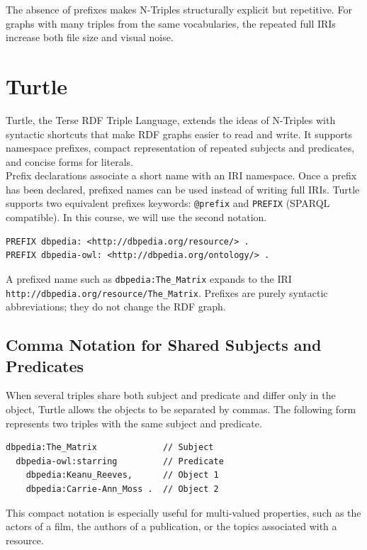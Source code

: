 \documentclass{scrbook}
\begin{document}
	The absence of prefixes makes N-Triples structurally explicit but repetitive. For graphs with many triples from the same vocabularies, the repeated full IRIs increase both file size and visual noise.
	
	\section{Turtle}
	
	Turtle, the Terse RDF Triple Language, extends the ideas of N-Triples with syntactic shortcuts that make RDF graphs easier to read and write. It supports namespace prefixes, compact representation of repeated subjects and predicates, and concise forms for literals.\\
	
	Prefix declarations associate a short name with an IRI namespace. Once a prefix has been declared, prefixed names can be used instead of writing full IRIs. Turtle supports two equivalent prefixes keywords: \texttt{@prefix} and \texttt{PREFIX} (SPARQL compatible). In this course, we will use the second notation.
	
	\begin{lstlisting}
PREFIX dbpedia: <http://dbpedia.org/resource/> .
PREFIX dbpedia-owl: <http://dbpedia.org/ontology/> .
	\end{lstlisting}
	
	A prefixed name such as \texttt{dbpedia:The\_Matrix} expands to the IRI\\
	\texttt{http://dbpedia.org/resource/The\_Matrix}. Prefixes are purely syntactic abbreviations; they do not change the RDF graph.
	
	\subsection{Comma Notation for Shared Subjects and Predicates}
	
	When several triples share both subject and predicate and differ only in the object, Turtle allows the objects to be separated by commas. The following form represents two triples with the same subject and predicate.
	
	\begin{lstlisting}
dbpedia:The_Matrix             // Subject
  dbpedia-owl:starring         // Predicate
    dbpedia:Keanu_Reeves,      // Object 1
    dbpedia:Carrie-Ann_Moss .  // Object 2
	\end{lstlisting}
	
	This compact notation is especially useful for multi-valued properties, such as the actors of a film, the authors of a publication, or the topics associated with a resource.
	
\end{document}
